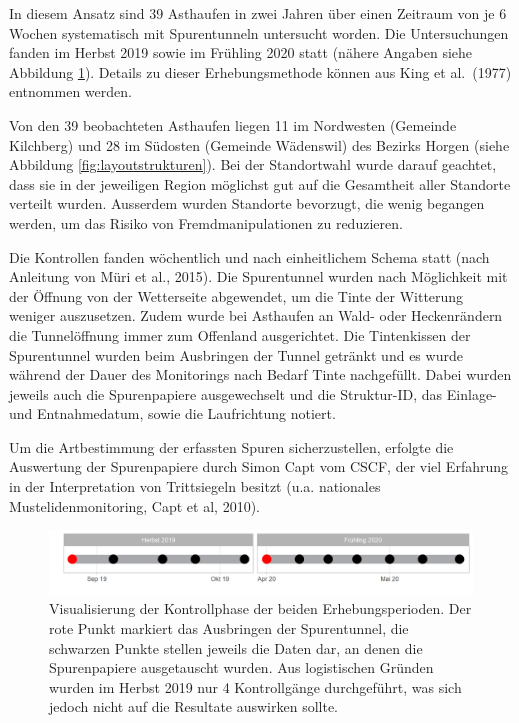 \documentclass[
  oneside]{scrbook}
\begin{document}
In diesem Ansatz sind 39 Asthaufen in zwei Jahren über einen Zeitraum von je 6 Wochen systematisch mit Spurentunneln untersucht worden. Die Untersuchungen fanden im Herbst 2019 sowie im Frühling 2020 statt (nähere Angaben siehe Abbildung \ref{fig:erhebungswoche}). Details zu dieser Erhebungsmethode können aus King et al.~(1977) entnommen werden.

Von den 39 beobachteten Asthaufen liegen 11 im Nordwesten (Gemeinde Kilchberg) und 28 im Südosten (Gemeinde Wädenswil) des Bezirks Horgen (siehe Abbildung \ref{fig:layoutstrukturen}). Bei der Standortwahl wurde darauf geachtet, dass sie in der jeweiligen Region möglichst gut auf die Gesamtheit aller Standorte verteilt wurden. Ausserdem wurden Standorte bevorzugt, die wenig begangen werden, um das Risiko von Fremdmanipulationen zu reduzieren.

Die Kontrollen fanden wöchentlich und nach einheitlichem Schema statt (nach Anleitung von Müri et al., 2015). Die Spurentunnel wurden nach Möglichkeit mit der Öffnung von der Wetterseite abgewendet, um die Tinte der Witterung weniger auszusetzen. Zudem wurde bei Asthaufen an Wald- oder Heckenrändern die Tunnelöffnung immer zum Offenland ausgerichtet. Die Tintenkissen der Spurentunnel wurden beim Ausbringen der Tunnel getränkt und es wurde während der Dauer des Monitorings nach Bedarf Tinte nachgefüllt. Dabei wurden jeweils auch die Spurenpapiere ausgewechselt und die Struktur-ID, das Einlage- und Entnahmedatum, sowie die Laufrichtung notiert.

Um die Artbestimmung der erfassten Spuren sicherzustellen, erfolgte die Auswertung der Spurenpapiere durch Simon Capt vom CSCF, der viel Erfahrung in der Interpretation von Trittsiegeln besitzt (u.a. nationales Mustelidenmonitoring, Capt et al, 2010).



\begin{figure}
\includegraphics[width=1\linewidth]{images/Erhebungswochen} \caption{Visualisierung der Kontrollphase der beiden Erhebungsperioden. Der rote Punkt markiert das Ausbringen der Spurentunnel, die schwarzen Punkte stellen jeweils die Daten dar, an denen die Spurenpapiere ausgetauscht wurden. Aus logistischen Gründen wurden im Herbst 2019 nur 4 Kontrollgänge durchgeführt, was sich jedoch nicht auf die Resultate auswirken sollte.}\label{fig:erhebungswoche}
\end{figure}
\end{document}
